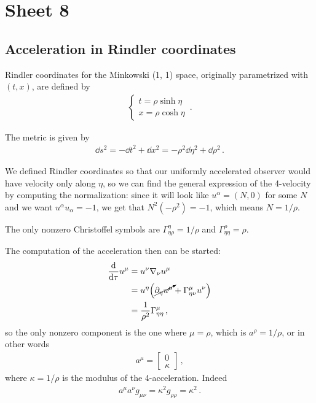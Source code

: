 \documentclass[main.tex]{subfiles}
\begin{document}
\section{Sheet 8}

\subsection{Acceleration in Rindler coordinates}

Rindler coordinates for the Minkowski (1, 1) space, originally parametrized with \((t, x)\), are defined by 
%
\begin{align}
  \begin{cases}
      t = \rho \sinh \eta \\
      x = \rho \cosh \eta 
  \end{cases}
\,.
\end{align}

The metric is given by 
%
\begin{align}
  \dd{s^2} = - \dd{t^2} + \dd{x^2} =
  - \rho^2 \dd{\eta^2} + \dd{\rho^2}
\,.
\end{align}

We defined Rindler coordinates so that our uniformly accelerated observer would have velocity only along \(\eta \), so we can find the general expression of the 4-velocity by computing the normalization: since it will look like \(u^{\alpha } = (N, 0)\) for some \(N\) and we want \(u^{\alpha } u_{\alpha } = -1\), we get that \(N^2(-\rho^2) = -1 \), which means \(N = 1/ \rho \). 

The only nonzero Christoffel symbols are \(\Gamma^{\eta }_{\eta \rho } = 1/\rho \) and \(\Gamma^{\rho }_{\eta \eta }= \rho \). 

The computation of the acceleration then can be started: 
%
\begin{align}
  \dv{}{\tau } u^{\mu } &= u^{\nu } \nabla_{\nu } u^{\mu }  \\
  &= u^{\eta } \qty(\cancelto{}{\partial_{\eta } u^{\mu }} + \Gamma^{\mu }_{\eta \nu } u^{\nu })  \\
  &= \frac{1}{\rho^2} \Gamma^{\mu }_{\eta \eta }
\,,
\end{align}
%
so the only nonzero component is the one where \(\mu = \rho \), which is \(a^{\rho } = 1/\rho \), or in other words
%
\begin{align}
  a^{\mu } = \left[\begin{array}{c}
  0 \\ 
  \kappa 
  \end{array}\right]
\,,
\end{align}
%
where \(\kappa = 1/ \rho \) is the modulus of the 4-acceleration. Indeed 
%
\begin{align}
  a^{\mu } a^{\nu } g_{\mu \nu } = \kappa^2 g_{\rho \rho } = \kappa^2
\,.
\end{align}
%
\end{document}
